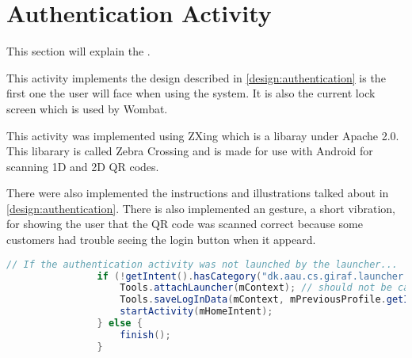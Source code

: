 \section{Authentication Activity}
This section will explain the .

This activity implements the design described in \autoref{design:authentication} is the first one the user will face when using the \giraf[] system. It is also the current lock screen which is used by Wombat. 

This activity was implemented using ZXing which is a libaray under Apache 2.0. This libarary is called Zebra Crossing and is made for use with Android for scanning 1D and 2D QR codes.

There were also implemented the instructions and illustrations talked about in \autoref{design:authentication}. There is also implemented an gesture, a short vibration, for showing the user that the QR code was scanned correct because some customers had trouble seeing the login button when it appeard.

\begin{lstlisting}[style=sourceCode, language=JAVA, caption=This is code, label=lst:authenticationAcitivity] 
				// If the authentication activity was not launched by the launcher...
				if (!getIntent().hasCategory("dk.aau.cs.giraf.launcher.GIRAF")) {
					Tools.attachLauncher(mContext); // should not be called
					Tools.saveLogInData(mContext, mPreviousProfile.getId());
					startActivity(mHomeIntent);
				} else {
					finish();
				}
\end{lstlisting}
